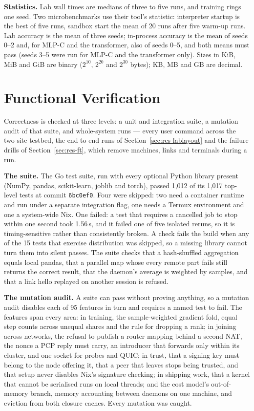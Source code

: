 \textbf{Statistics.} Lab wall times are medians of three to five runs, and
training rings one seed. Two microbenchmarks use their tool's statistic:
interpreter startup is the best of five runs, sandbox start the mean of 20 runs
after five warm-up runs. Lab accuracy is the mean of three
seeds; in-process accuracy is the mean of seeds 0--2 and, for MLP-C and the
transformer, also of seeds 0--5, and both means must pass (seeds 3--5 were run
for MLP-C and the transformer only). Sizes in
KiB, MiB and GiB are binary ($2^{10}$, $2^{20}$ and $2^{30}$ bytes); KB, MB and
GB are decimal.

\section{Functional Verification}
\label{sec:res-tests}

Correctness is checked at three levels: a unit and integration suite, a
mutation audit of that suite, and whole-system runs --- every user command
across the two-site testbed, the end-to-end runs of
Section~\ref{sec:res-lablayout} and the failure drills of
Section~\ref{sec:res-ft}, which remove machines, links and terminals during a
run.

\textbf{The suite.} The Go test suite, run with every optional Python library
present (NumPy, pandas, scikit-learn, joblib and torch), passed 1{,}012 of its
1{,}017 top-level tests at commit \texttt{6bc0ef0}. Four were skipped: two need
a container runtime and run under a separate integration flag, one needs a
Termux environment and one a system-wide Nix. One failed: a test that requires
a cancelled job to stop within one second took 1.56\,s, and it failed one of
five isolated reruns, so it is timing-sensitive rather than consistently
broken. A check fails the build when any of the 15 tests that
exercise distribution was skipped, so a missing library cannot turn them into
silent passes. The suite checks that a hash-shuffled aggregation equals local
pandas, that a parallel map whose every remote part fails still returns the
correct result, that the daemon's average is weighted by samples, and that a
link hello replayed on another session is refused.

\textbf{The mutation audit.} A suite can pass without proving anything, so a
mutation audit disables each of 95 features in turn and requires a named test to
fail. The features span every area: in training, the sample-weighted gradient
fold, equal step counts across unequal shares and the rule for dropping a rank;
in joining across networks, the refusal to publish a router mapping behind a
second NAT, the nonce a PCP reply must carry, an introducer that forwards only
within its cluster, and one socket for probes and QUIC; in trust, that a
signing key must belong to the node offering it, that a peer that leaves stops
being trusted, and that setup never disables Nix's signature checking; in
shipping work, that a kernel that cannot be serialised runs on local threads;
and the cost model's out-of-memory branch, memory accounting between daemons on
one machine, and eviction from both closure caches. Every mutation was caught.

